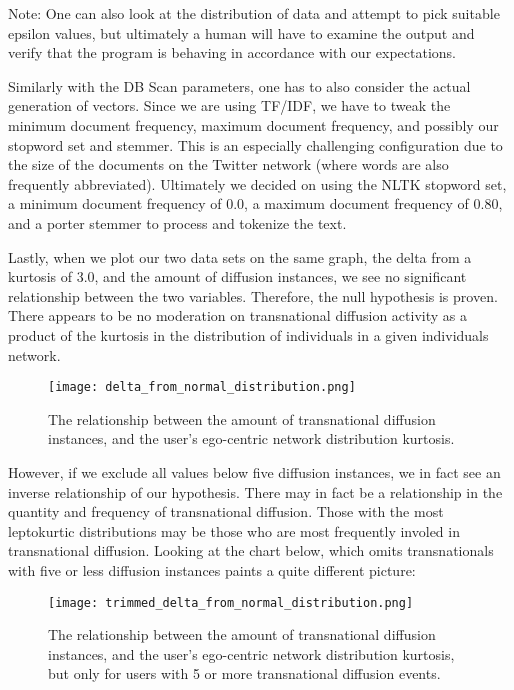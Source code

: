 Note: One can also look at the distribution of data and attempt to
pick suitable epsilon values, but ultimately a human will have to
examine the output and verify that the program is behaving in
accordance with our expectations.

Similarly with the DB Scan parameters, one has to also consider the
actual generation of vectors. Since we are using TF/IDF, we have to
tweak the minimum document frequency, maximum document frequency, and
possibly our stopword set and stemmer. This is an especially
challenging configuration due to the size of the documents on the
Twitter network (where words are also frequently
abbreviated). Ultimately we decided on using the NLTK stopword set, a
minimum document frequency of 0.0, a maximum document frequency of
0.80, and a porter stemmer to process and tokenize the text.

Lastly, when we plot our two data sets on the same graph, the delta
from a kurtosis of 3.0, and the amount of diffusion instances, we see
no significant relationship between the two variables. Therefore, the
null hypothesis is proven. There appears to be no moderation on
transnational diffusion activity as a product of the kurtosis in the
distribution of individuals in a given individuals network.
\begin{figure}[H]
  \centering
  \texttt{[image: delta\_from\_normal\_distribution.png]}
  \caption{The relationship between the amount of transnational diffusion instances, and the user's ego-centric network distribution kurtosis.}
\end{figure}

However, if we exclude all values below five diffusion instances, we
in fact see an inverse relationship of our hypothesis. There may in fact
be a relationship in the quantity and frequency of transnational
diffusion. Those with the most leptokurtic distributions may be those
who are most frequently involed in transnational diffusion. Looking at the
chart below, which omits transnationals with five or less diffusion instances
paints a quite different picture:
\begin{figure}[H]
  \centering
  \texttt{[image: trimmed\_delta\_from\_normal\_distribution.png]}
  \caption{The relationship between the amount of transnational diffusion instances, and the user's ego-centric network distribution kurtosis, but only for users with 5 or more transnational diffusion events.}
\end{figure}
